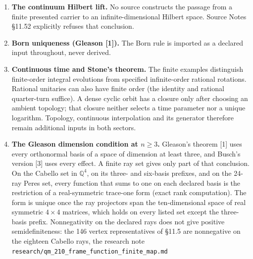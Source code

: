 \documentclass[
  11pt,
]{article}
\providecommand{\tightlist}{%
  \setlength{\itemsep}{0pt}\setlength{\parskip}{0pt}}
\begin{document}
\begin{enumerate}
\def\labelenumi{\arabic{enumi}.}
\tightlist
\item
  \textbf{The continuum Hilbert lift.} No source constructs the passage
  from a finite presented carrier to an infinite-dimensional Hilbert
  space. Source Notes §11.52 explicitly refuses that conclusion.
\item
  \textbf{Born uniqueness (Gleason {[}1{]}).} The Born rule is imported
  as a declared input throughout, never derived.
\item
  \textbf{Continuous time and Stone's theorem.} The finite examples
  distinguish finite-order integral evolutions from specified
  infinite-order rational rotations. Rational unitaries can also have
  finite order (the identity and rational quarter-turn suffice). A dense
  cyclic orbit has a closure only after choosing an ambient topology;
  that closure neither selects a time parameter nor a unique logarithm.
  Topology, continuous interpolation and its generator therefore remain
  additional inputs in both sectors.
\item
  \textbf{The Gleason dimension condition at \(n \ge 3\).} Gleason's
  theorem {[}1{]} uses every orthonormal basis of a space of dimension
  at least three, and Busch's version {[}3{]} uses every effect. A
  finite ray set gives only part of that conclusion. On the Cabello set
  in \(\mathbb Q^4\), on its three- and six-basis prefixes, and on the
  24-ray Peres set, every function that sums to one on each declared
  basis is the restriction of a real-symmetric trace-one form (exact
  rank computation). The form is unique once the ray projectors span the
  ten-dimensional space of real symmetric \(4\times4\) matrices, which
  holds on every listed set except the three-basis prefix. Nonnegativity
  on the declared rays does not give positive semidefiniteness: the 146
  vertex representatives of §11.5 are nonnegative on the eighteen
  Cabello rays, the research note
  \texttt{r\allowbreak{}e\allowbreak{}s\allowbreak{}e\allowbreak{}a\allowbreak{}r\allowbreak{}c\allowbreak{}h\allowbreak{}/\allowbreak{}q\allowbreak{}m\allowbreak{}\_\allowbreak{}2\allowbreak{}1\allowbreak{}0\allowbreak{}\_\allowbreak{}f\allowbreak{}r\allowbreak{}a\allowbreak{}m\allowbreak{}e\allowbreak{}\_\allowbreak{}f\allowbreak{}u\allowbreak{}n\allowbreak{}c\allowbreak{}t\allowbreak{}i\allowbreak{}o\allowbreak{}n\allowbreak{}\_\allowbreak{}f\allowbreak{}i\allowbreak{}n\allowbreak{}i\allowbreak{}t\allowbreak{}e\allowbreak{}\_\allowbreak{}m\allowbreak{}a\allowbreak{}p\allowbreak{}.\allowbreak{}m\allowbreak{}d}

\end{enumerate}
\end{document}
